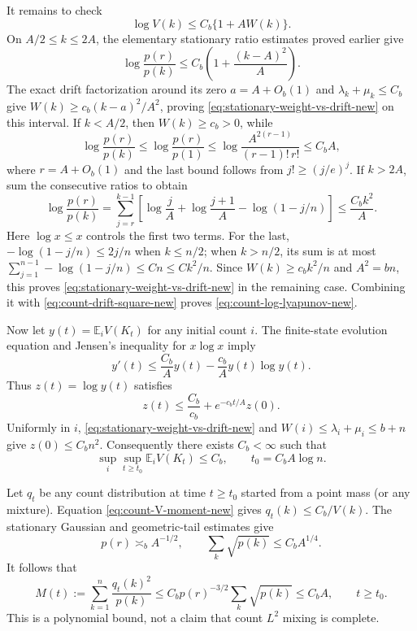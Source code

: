 It remains to check
\begin{equation}\label{eq:stationary-weight-vs-drift-new}
 \log V(k)\leq C_b\{1+A W(k)\}.
\end{equation}
On $A/2\leq k\leq2A$, the elementary stationary ratio estimates proved
earlier give
\[
 \log\frac{p(r)}{p(k)}\leq C_b\left(1+\frac{(k-A)^2}{A}\right).
\]
The exact drift factorization around its zero $a=A+O_b(1)$ and
$\lambda_k+\mu_k\leq C_b$ give
$W(k)\geq c_b(k-a)^2/A^2$, proving
\eqref{eq:stationary-weight-vs-drift-new} on this interval.
If $k<A/2$, then $W(k)\geq c_b>0$, while
\[
 \log\frac{p(r)}{p(k)}\leq\log\frac{p(r)}{p(1)}
 \leq\log\frac{A^{2(r-1)}}{(r-1)!\,r!}\leq C_bA,
\]
where $r=A+O_b(1)$ and the last bound follows from
$j!\geq(j/e)^j$.
If $k>2A$, sum the consecutive ratios to obtain
\[
 \log\frac{p(r)}{p(k)}
 =\sum_{j=r}^{k-1}
 \left[\log\frac jA+\log\frac{j+1}A-\log(1-j/n)\right]
 \leq\frac{C_bk^2}{A}.
\]
Here $\log x\leq x$ controls the first two terms. For the last,
$-\log(1-j/n)\leq2j/n$ when $k\leq n/2$; when $k>n/2$, its sum is
at most
$\sum_{j=1}^{n-1}-\log(1-j/n)\leq Cn\leq Ck^2/n$.
Since $W(k)\geq c_bk^2/n$ and $A^2=bn$, this proves
\eqref{eq:stationary-weight-vs-drift-new} in the remaining case.
Combining it with \eqref{eq:count-drift-square-new} proves
\eqref{eq:count-log-lyapunov-new}.

Now let $y(t)=\mathbb E_iV(K_t)$ for any initial count $i$.
The finite-state evolution equation and Jensen's inequality for
$x\log x$ imply
\[
 y'(t)\leq\frac{C_b}{A}y(t)-\frac{c_b}{A}y(t)\log y(t).
\]
Thus $z(t)=\log y(t)$ satisfies
\[
 z(t)\leq\frac{C_b}{c_b}+e^{-c_bt/A}z(0).
\]
Uniformly in $i$, \eqref{eq:stationary-weight-vs-drift-new} and
$W(i)\leq\lambda_i+\mu_i\leq b+n$ give
$z(0)\leq C_bn^2$. Consequently there exists $C_b<\infty$ such that
\begin{equation}\label{eq:count-V-moment-new}
 \sup_i\sup_{t\geq t_0}\mathbb E_iV(K_t)\leq C_b,
 \qquad t_0=C_b A\log n.
\end{equation}

Let $q_t$ be any count distribution at time $t\geq t_0$ started from a
point mass (or any mixture). Equation \eqref{eq:count-V-moment-new}
gives $q_t(k)\leq C_b/V(k)$. The stationary Gaussian and geometric-tail
estimates give
\[
 p(r)\asymp_b A^{-1/2},\qquad \sum_k\sqrt{p(k)}\leq C_b A^{1/4}.
\]
It follows that
\begin{equation}\label{eq:count-L2-polynomial-new}
 M(t):=\sum_{k=1}^n\frac{q_t(k)^2}{p(k)}
 \leq C_bp(r)^{-3/2}\sum_k\sqrt{p(k)}\leq C_bA,
 \qquad t\geq t_0.
\end{equation}
This is a polynomial bound, not a claim that count $L^2$ mixing is complete.


